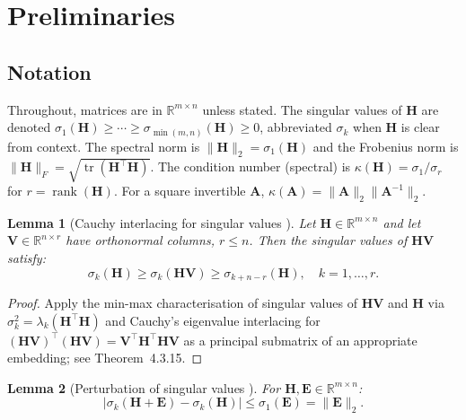 \documentclass[11pt,a4paper]{article}
\theoremstyle{plain}
\newtheorem{lemma}{Lemma}
\theoremstyle{definition}
\theoremstyle{remark}
\newcommand{\bfH}{\mathbf{H}}
\newcommand{\bfA}{\mathbf{A}}
\newcommand{\bfE}{\mathbf{E}}
\newcommand{\bfV}{\mathbf{V}}
\newcommand{\norm}[1]{\|#1\|}
\DeclareMathOperator{\rank}{rank}
\DeclareMathOperator{\tr}{tr}
\begin{document}
\section{Preliminaries}
\label{sec:prelim}

\subsection{Notation}

Throughout, matrices are in $\mathbb{R}^{m \times n}$ unless stated.
The singular values of $\bfH$ are denoted $\sigma_1(\bfH) \geq \cdots
\geq \sigma_{\min(m,n)}(\bfH) \geq 0$, abbreviated $\sigma_k$ when
$\bfH$ is clear from context.  The spectral norm is
$\norm{\bfH}_2 = \sigma_1(\bfH)$ and the Frobenius norm is
$\norm{\bfH}_F = \sqrt{\tr(\bfH^\top\bfH)}$.
The condition number (spectral) is $\kappa(\bfH) = \sigma_1/\sigma_r$
for $r = \rank(\bfH)$.
For a square invertible $\bfA$, $\kappa(\bfA) = \norm{\bfA}_2\norm{\bfA^{-1}}_2$.

\begin{lemma}[Cauchy interlacing for singular values {\cite{Horn2013}}]
\label{lem:cauchy}
Let $\bfH \in \mathbb{R}^{m \times n}$ and let
$\bfV \in \mathbb{R}^{n \times r}$ have orthonormal columns, $r \leq n$.
Then the singular values of $\bfH\bfV$ satisfy:
\begin{equation}
  \sigma_k(\bfH) \geq \sigma_k(\bfH\bfV) \geq \sigma_{k+n-r}(\bfH),
  \quad k = 1,\ldots,r.
  \label{eq:cauchy_sv}
\end{equation}
\end{lemma}
\begin{proof}
Apply the min-max characterisation of singular values of $\bfH\bfV$
and $\bfH$ via $\sigma_k^2 = \lambda_k(\bfH^\top\bfH)$ and
Cauchy's eigenvalue interlacing for $(\bfH\bfV)^\top(\bfH\bfV) =
\bfV^\top\bfH^\top\bfH\bfV$ as a principal submatrix of an
appropriate embedding; see \cite{Horn2013} Theorem~4.3.15.
\end{proof}

\begin{lemma}[Perturbation of singular values {\cite{Weyl1912,Golub2013}}]
\label{lem:weyl}
For $\bfH, \bfE \in \mathbb{R}^{m \times n}$:
\begin{equation}
  |\sigma_k(\bfH + \bfE) - \sigma_k(\bfH)| \leq \sigma_1(\bfE) = \norm{\bfE}_2.
  \label{eq:weyl}
\end{equation}
\end{lemma}
\end{document}
